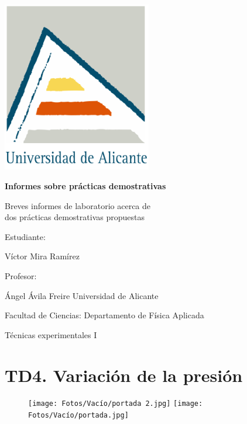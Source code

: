 \documentclass[12pt,letterpaper,oneside,openany,spanish]{book}
\begin{document}
   

\newcommand{\titulo}{Informes sobre prácticas demostrativas}
\newcommand{\nombreestudiante}{Víctor Mira Ramírez}
\newcommand{\nombredirector}{Ángel Ávila Freire}
\newcommand{\fecha}{\date{Febrero 2023}}  %


\pagebreak

\renewcommand{\listtablename}{Índice de tablas} 
\renewcommand{\tablename}{Tabla} 

\begin{titlepage}
	\centering
	\includegraphics[width=65mm]{Fotos/logoUA.png}\par
	\vspace{1cm}
	{\LARGE\bfseries \titulo \par}
	\vfill
	{\large Breves informes de laboratorio acerca de \\ 
	dos prácticas demostrativas propuestas\par
	\vfill
	Estudiante:\par\vspace{2mm}
	\nombreestudiante\par
	\vfill
	Profesor:\par\vspace{2mm}
    \nombredirector
    \vfill
    Universidad de Alicante\par
    Facultad de Ciencias: Departamento de Física Aplicada\par
    Técnicas experimentales I\par
	\fecha\par}
\end{titlepage}

\pagebreak
\tableofcontents
\pagebreak

\setcounter{page}{4}
    \chapter[TD4. Variación de la presión]{TD4. Variación de la presión}
    \thispagestyle{empty}
    \vspace{1cm}
    \begin{figure}[h]
        \centering
        \hspace*{-0.2cm}
        \texttt{[image: Fotos/Vacío/portada 2.jpg]}\hfill
        \texttt{[image: Fotos/Vacío/portada.jpg]}
        \hspace*{-0.4cm}
    \end{figure}

\end{document}
